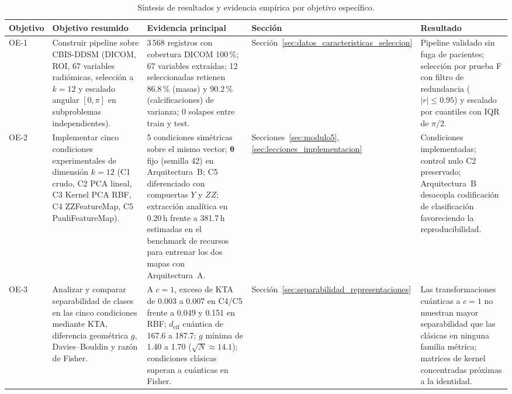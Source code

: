 \begin{table}[htbp]
\centering
\small
\caption{Síntesis de resultados y evidencia empírica por objetivo específico.}
\label{tab:sintesis_objetivos_especificos}
\begin{adjustbox}{max width=\linewidth}
\begin{tabular}{p{0.07\linewidth} p{0.24\linewidth} p{0.31\linewidth} p{0.14\linewidth} p{0.24\linewidth}}
\toprule
\textbf{Objetivo} & \textbf{Objetivo resumido} & \textbf{Evidencia principal} & \textbf{Sección} & \textbf{Resultado} \\
\midrule
OE-1 & Construir pipeline sobre CBIS-DDSM (DICOM, ROI, 67 variables radiómicas, selección a $k = 12$ y escalado angular $[0, \pi]$ en subproblemas independientes). & 3\,568 registros con cobertura DICOM 100\,\%; 67 variables extraídas; 12 seleccionadas retienen 86.8\,\% (masas) y 90.2\,\% (calcificaciones) de varianza; 0 solapes entre train y test. & Sección~\ref{sec:datos_caracteristicas_seleccion} & Pipeline validado sin fuga de pacientes; selección por prueba F con filtro de redundancia ($|r| \le 0.95$) y escalado por cuantiles con IQR de $\pi/2$. \\
\midrule
OE-2 & Implementar cinco condiciones experimentales de dimensión $k = 12$ (C1 crudo, C2 PCA lineal, C3 Kernel PCA RBF, C4 ZZFeatureMap, C5 PauliFeatureMap). & 5 condiciones simétricas sobre el mismo vector; $\boldsymbol\theta$ fijo (semilla 42) en Arquitectura~B; C5 diferenciado con compuertas $Y$ y $ZZ$; extracción analítica en 0.20\,h frente a 381.7\,h estimadas en el benchmark de recursos para entrenar los dos mapas con Arquitectura~A. & Secciones~\ref{sec:modulo5}, \ref{sec:lecciones_implementacion} & Condiciones implementadas; control nulo C2 preservado; Arquitectura~B desacopla codificación de clasificación favoreciendo la reproducibilidad. \\
\midrule
OE-3 & Analizar y comparar separabilidad de clases en las cinco condiciones mediante KTA, diferencia geométrica $g$, Davies--Bouldin y razón de Fisher. & A $c = 1$, exceso de KTA de 0.003 a 0.007 en C4/C5 frente a 0.049 y 0.151 en RBF; $d_{\mathrm{eff}}$ cuántica de 167.6 a 187.7; $g$ mínima de 1.40 a 1.70 ($\sqrt{N} \approx 14.1$); condiciones clásicas superan a cuánticas en Fisher. & Sección~\ref{sec:separabilidad_representaciones} & Las transformaciones cuánticas a $c = 1$ no muestran mayor separabilidad que las clásicas en ninguna familia métrica; matrices de kernel concentradas próximas a la identidad. \\

\end{tabular}
\end{adjustbox}
\end{table}
